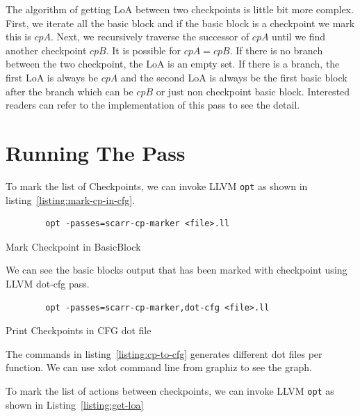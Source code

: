 The algorithm of getting LoA between two checkpoints is little bit more complex.
First, we iterate all the basic block and if the basic block is a checkpoint we
mark this is $cpA$. Next, we recursively traverse the successor of $cpA$ until
we find another checkpoint $cpB$. It is possible for $cpA = cpB$. If there is no
branch between the two checkpoint, the LoA is an empty set. If there is a
branch, the first LoA is always be $cpA$ and the second LoA is always be the
first basic block after the branch \textemdash{} which can be $cpB$ or just non
checkpoint basic block. Interested readers can refer to the implementation of
this pass to see the detail.

\section{Running The Pass}


To mark the list of Checkpoints, we can invoke LLVM \texttt{opt} as shown in
listing~\ref{listing:mark-cp-in-cfg}.

\begin{listing}[htbp]
    \begin{verbatim}
        opt -passes=scarr-cp-marker <file>.ll
    \end{verbatim}
    \caption{Mark Checkpoint in BasicBlock}    
    \label{listing:mark-cp-in-cfg}
\end{listing}

We can see the basic blocks output that has been marked with checkpoint using
LLVM dot-cfg pass.

\begin{listing}[htbp]
    \begin{verbatim}
        opt -passes=scarr-cp-marker,dot-cfg <file>.ll
    \end{verbatim}
    \caption{Print Checkpoints in CFG dot file}    
    \label{listing:cp-to-cfg}
\end{listing}

The commands in listing~\ref{listing:cp-to-cfg} generates different dot files
per function. We can use xdot command line from graphiz to see the graph. 

To mark the list of actions between checkpoints, we can invoke LLVM \texttt{opt}
as shown in Listing~\ref{listing:get-loa}

